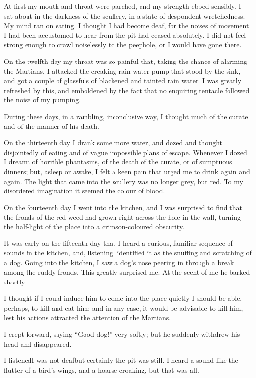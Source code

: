 At first my mouth and throat were parched, and my strength ebbed
sensibly. I sat about in the darkness of the scullery, in a state
of despondent wretchedness. My mind ran on eating. I thought I had
become deaf, for the noises of movement I had been accustomed to
hear from the pit had ceased absolutely. I did not feel strong
enough to crawl noiselessly to the peephole, or I would have gone
there.

On the twelfth day my throat was so painful that, taking the chance
of alarming the Martians, I attacked the creaking rain-water pump
that stood by the sink, and got a couple of glassfuls of blackened
and tainted rain water. I was greatly refreshed by this, and
emboldened by the fact that no enquiring tentacle followed the
noise of my pumping.

During these days, in a rambling, inconclusive way, I thought much
of the curate and of the manner of his death.

On the thirteenth day I drank some more water, and dozed and
thought disjointedly of eating and of vague impossible plans of
escape. Whenever I dozed I dreamt of horrible phantasms, of the
death of the curate, or of sumptuous dinners; but, asleep or awake,
I felt a keen pain that urged me to drink again and again. The
light that came into the scullery was no longer grey, but red. To
my disordered imagination it seemed the colour of blood.

On the fourteenth day I went into the kitchen, and I was surprised
to find that the fronds of the red weed had grown right across the
hole in the wall, turning the half-light of the place into a
crimson-coloured obscurity.

It was early on the fifteenth day that I heard a curious, familiar
sequence of sounds in the kitchen, and, listening, identified it as
the snuffing and scratching of a dog. Going into the kitchen, I saw
a dog's nose peering in through a break among the ruddy fronds.
This greatly surprised me. At the scent of me he barked shortly.

I thought if I could induce him to come into the place quietly I
should be able, perhaps, to kill and eat him; and in any case, it
would be advisable to kill him, lest his actions attracted the
attention of the Martians.

I crept forward, saying ``Good dog!'' very softly; but he suddenly
withdrew his head and disappeared.

I listened\dash{}I was not deaf\dash{}but certainly the pit was still. I
heard a sound like the flutter of a bird's wings, and a hoarse
croaking, but that was all.

